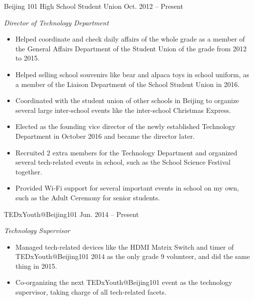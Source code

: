 \documentclass[hidelinks__VERSION__]{adamyi-cv} %
\begin{document}
\begin{entrylist}


\entry
{Beijing 101 High School Student Union}
{Oct. 2012 -- Present}
{\emph{Director of Technology Department}
\begin{itemize}
\item Helped coordinate and check daily affairs of the whole grade as a member of the General Affairs Department of the Student Union of the grade from 2012 to 2015.
\item Helped selling school souvenirs like bear and alpaca toys in school uniform, as a member of the Liaison Department of the School Student Union in 2016.
\item Coordinated with the student union of other schools in Beijing to organize several large inter-school events like the inter-school Christmas Express.
\item Elected as the founding vice director of the newly established Technology Department in October 2016 and became the director later.
\item Recruited 2 extra members for the Technology Department and organized several tech-related events in school, such as the School Science Festival together.
\item Provided Wi-Fi support for several important events in school on my own, such as the Adult Ceremony for senior students.
\end{itemize}}


\entry
{TEDxYouth@Beijing101}
{Jun. 2014 -- Present}
{\emph{Technology Supervisor}
\begin{itemize}
\item Managed tech-related devices like the HDMI Matrix Switch and timer of TEDxYouth@Beijing101 2014 as the only grade 9 volunteer, and did the same thing in 2015.
\item Co-organizing the next TEDxYouth@Beijing101 event as the technology supervisor, taking charge of all tech-related facets.
\end{itemize}}


\end{entrylist}
\end{document}
